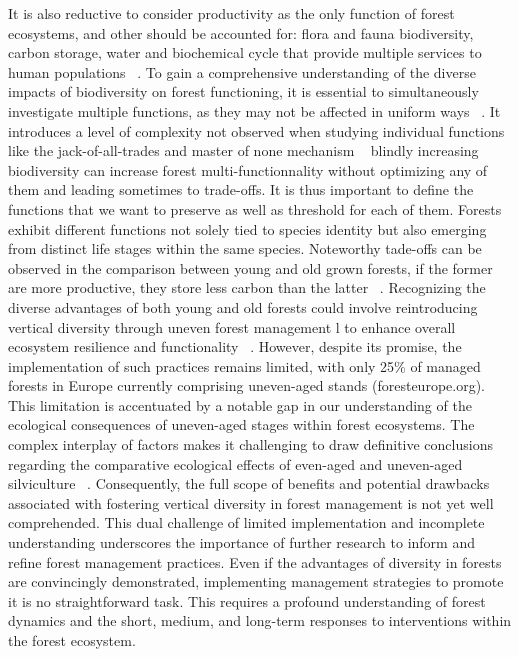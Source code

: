 \documentclass{article}
\begin{document}
It is also reductive to consider productivity as the only function of forest ecosystems, and other should be accounted for: flora and fauna biodiversity, carbon storage, water and biochemical cycle that provide multiple services to human populations ~\autocite{aertsForestRestorationBiodiversity2011}.
To gain a comprehensive understanding of the diverse impacts of biodiversity on forest functioning, it is essential to simultaneously investigate multiple functions, as they may not be affected in uniform ways ~\autocite{korboulewskyHowTreeDiversity2016}. It introduces a level of complexity not observed when studying individual functions like the jack-of-all-trades and master of none mechanism ~\autocite{vanderplasJackofalltradesEffectsDrive2016} blindly increasing biodiversity can increase forest multi-functionnality without optimizing any of them and leading sometimes to trade-offs. It is thus important to define the functions that we want to preserve as well as threshold for each of them. 
Forests exhibit different functions not solely tied to species identity but also emerging from distinct life stages within the same species. Noteworthy tade-offs can be observed in the comparison between young and old grown forests, if the former are more productive, they store less carbon than the latter ~\autocite{caspersenSuccessionalDiversityForest2001}. Recognizing the diverse advantages of both young and old forests could involve reintroducing vertical diversity through uneven forest management l to enhance overall ecosystem resilience and functionality ~\autocite{guldinRoleUnevenAgedSilviculture1996}. However, despite its promise, the implementation of such practices remains limited, with only 25\% of managed forests in Europe currently comprising uneven-aged stands (foresteurope.org).
This limitation is accentuated by a notable gap in our understanding of the ecological consequences of uneven-aged stages within forest ecosystems. The complex interplay of factors makes it challenging to draw definitive conclusions regarding the comparative ecological effects of even-aged and uneven-aged silviculture ~\autocite{noletComparingEffectsEven2018}. Consequently, the full scope of benefits and potential drawbacks associated with fostering vertical diversity in forest management is not yet well comprehended. This dual challenge of limited implementation and incomplete understanding underscores the importance of further research to inform and refine forest management practices.
Even if the advantages of diversity in forests are convincingly demonstrated, implementing management strategies to promote it is no straightforward task. This requires a profound understanding of forest dynamics and the short, medium, and long-term responses to interventions within the forest ecosystem.
\end{document}
